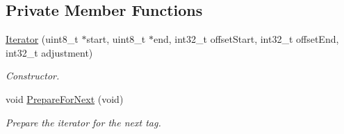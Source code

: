 \subsection*{Private Member Functions}
\begin{DoxyCompactItemize}
\item 
\hyperlink{classns3_1_1ByteTagList_1_1Iterator_ab9031b4aef2a032095f3bf38cd507255}{Iterator} (uint8\+\_\+t $\ast$start, uint8\+\_\+t $\ast$end, int32\+\_\+t offset\+Start, int32\+\_\+t offset\+End, int32\+\_\+t adjustment)
\begin{DoxyCompactList}\small\item\em Constructor. \end{DoxyCompactList}\item 
void \hyperlink{classns3_1_1ByteTagList_1_1Iterator_afeebeb2923b6d7d908b0868d9e4750e5}{Prepare\+For\+Next} (void)
\begin{DoxyCompactList}\small\item\em Prepare the iterator for the next tag. \end{DoxyCompactList}\end{DoxyCompactItemize}
